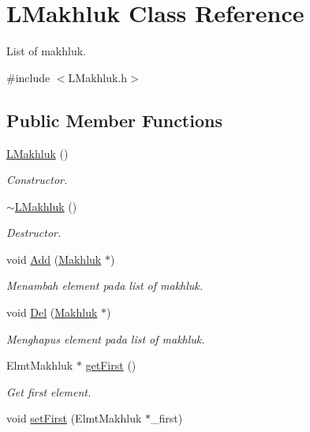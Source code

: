 \hypertarget{class_l_makhluk}{}\section{L\+Makhluk Class Reference}
\label{class_l_makhluk}


List of makhluk.  




{\ttfamily \#include $<$L\+Makhluk.\+h$>$}

\subsection*{Public Member Functions}
\begin{DoxyCompactItemize}
\item 
\hyperlink{class_l_makhluk_a93e97387f0cdfa01c31d42832011180c}{L\+Makhluk} ()
\begin{DoxyCompactList}\small\item\em Constructor. \end{DoxyCompactList}\item 
\hyperlink{class_l_makhluk_ab02db38f176572e290cfb444862f96f2}{$\sim$\+L\+Makhluk} ()
\begin{DoxyCompactList}\small\item\em Destructor. \end{DoxyCompactList}\item 
void \hyperlink{class_l_makhluk_ab2d61c43b62e8574b36f486c8907b620}{Add} (\hyperlink{class_makhluk}{Makhluk} $\ast$)
\begin{DoxyCompactList}\small\item\em Menambah element pada list of makhluk. \end{DoxyCompactList}\item 
void \hyperlink{class_l_makhluk_a04f838bb55f2af5c0c3a0068ce21b4ff}{Del} (\hyperlink{class_makhluk}{Makhluk} $\ast$)
\begin{DoxyCompactList}\small\item\em Menghapus element pada list of makhluk. \end{DoxyCompactList}\item 
Elmt\+Makhluk $\ast$ \hyperlink{class_l_makhluk_a0ea8a32be37178cd38e3e2e0ac22d5ee}{get\+First} ()
\begin{DoxyCompactList}\small\item\em Get first element. \end{DoxyCompactList}\item 
void \hyperlink{class_l_makhluk_a4c1e3394813fb95f8850e3f3fe7d9cec}{set\+First} (Elmt\+Makhluk $\ast$\+\_\+first)

\end{DoxyCompactItemize}
